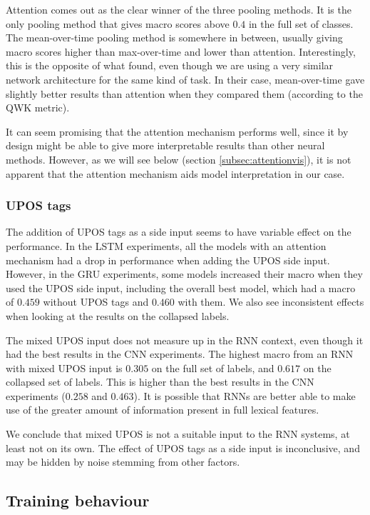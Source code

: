 Attention comes out as the clear winner of the three pooling methods. It is
the only pooling method that gives macro \FI scores above $0.4$ in the full
set of classes. The mean-over-time pooling method is somewhere in between,
usually giving macro \FI scores higher than max-over-time and lower than
attention. Interestingly, this is the opposite of what \textcite{taghipour16}
found, even though we are using a very similar network architecture for the
same kind of task. In their case, mean-over-time gave slightly better results
than attention when they compared them (according to the \ac{QWK} metric).

It can seem promising that the attention mechanism performs well, since it by
design might be able to give more interpretable results than other neural
methods. However, as we will see below (section \ref{subsec:attentionvis}),
it is not apparent that the attention mechanism aids model interpretation in
our case.


\subsubsection{UPOS tags}

The addition of UPOS tags as a side input seems to have variable effect on
the performance. In the LSTM experiments, all the models with an attention
mechanism had a drop in performance when adding the UPOS side input. However,
in the GRU experiments, some models increased their macro \FI when they used
the UPOS side input, including the overall best model, which had a macro \FI
of $0.459$ without UPOS tags and $0.460$ with them. We also see inconsistent
effects when looking at the results on the collapsed labels.

The mixed UPOS input does not measure up in the RNN context, even though it
had the best results in the CNN experiments. The highest macro \FI from an
RNN with mixed UPOS input is $0.305$ on the full set of labels, and $0.617$
on the collapsed set of labels. This is higher than the best results in the
CNN experiments ($0.258$ and $0.463$). It is possible that RNNs are better
able to make use of the greater amount of information present in full lexical
features.

We conclude that mixed UPOS is not a suitable input to the \ac{RNN}
systems, at least not on its own. The effect of UPOS tags as a side
input is inconclusive, and may be hidden by noise stemming from other
factors.


\subsection{Training behaviour}

